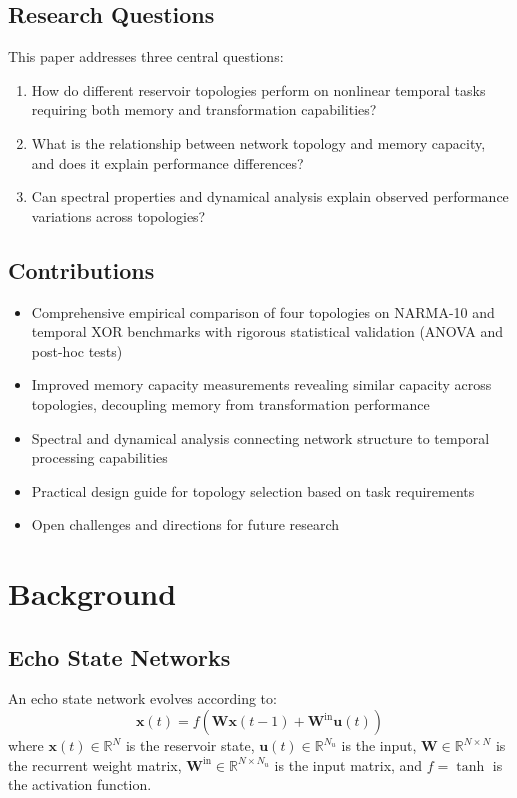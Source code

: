 \documentclass{article}
\begin{document}
\subsection{Research Questions}

This paper addresses three central questions:
\begin{enumerate}
\item How do different reservoir topologies perform on nonlinear temporal tasks requiring both memory and transformation capabilities?
\item What is the relationship between network topology and memory capacity, and does it explain performance differences?
\item Can spectral properties and dynamical analysis explain observed performance variations across topologies?
\end{enumerate}

\subsection{Contributions}

\begin{itemize}
\item Comprehensive empirical comparison of four topologies on NARMA-10 and temporal XOR benchmarks with rigorous statistical validation (ANOVA and post-hoc tests)
\item Improved memory capacity measurements revealing similar capacity across topologies, decoupling memory from transformation performance
\item Spectral and dynamical analysis connecting network structure to temporal processing capabilities
\item Practical design guide for topology selection based on task requirements
\item Open challenges and directions for future research
\end{itemize}

\section{Background}

\subsection{Echo State Networks}

An echo state network evolves according to:
\begin{equation}
\mathbf{x}(t) = f(\mathbf{W}\mathbf{x}(t-1) + \mathbf{W}^{\text{in}}\mathbf{u}(t))
\end{equation}
where $\mathbf{x}(t) \in \mathbb{R}^{N}$ is the reservoir state, $\mathbf{u}(t) \in \mathbb{R}^{N_u}$ is the input, $\mathbf{W} \in \mathbb{R}^{N \times N}$ is the recurrent weight matrix, $\mathbf{W}^{\text{in}} \in \mathbb{R}^{N \times N_u}$ is the input matrix, and $f = \tanh$ is the activation function.
\end{document}
